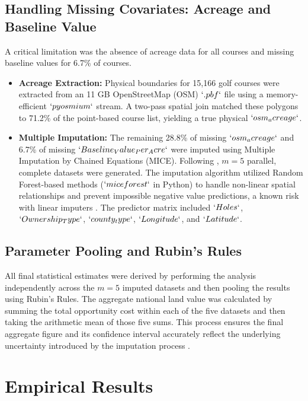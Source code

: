 \documentclass[10pt, letterpaper]{article}
\begin{document}
\subsection{Handling Missing Covariates: Acreage and Baseline Value}
A critical limitation was the absence of acreage data for all courses and missing baseline values for 6.7\% of courses.
\begin{itemize}
    \item \textbf{Acreage Extraction:} Physical boundaries for 15,166 golf courses were extracted from an 11 GB OpenStreetMap (OSM) $`.pbf`$ file using a memory-efficient $`pyosmium`$ stream. A two-pass spatial join matched these polygons to 71.2\% of the point-based course list, yielding a true physical $`osm_acreage`$.
    \item \textbf{Multiple Imputation:} The remaining 28.8\% of missing $`osm_acreage`$ and 6.7\% of missing $`Baseline_Value_Per_Acre`$ were imputed using Multiple Imputation by Chained Equations (MICE). Following \textcite{Rubin1987}, $m = 5$ parallel, complete datasets were generated. The imputation algorithm utilized Random Forest-based methods ($`miceforest`$ in Python) to handle non-linear spatial relationships and prevent impossible negative value predictions, a known risk with linear imputers \parencite{Burren2018}. The predictor matrix included $`Holes`$, $`Ownership_Type`$, $`county_type`$, $`Longitude`$, and $`Latitude`$.
\end{itemize}

\subsection{Parameter Pooling and Rubin's Rules}
All final statistical estimates were derived by performing the analysis independently across the $m=5$ imputed datasets and then pooling the results using Rubin's Rules. The aggregate national land value was calculated by summing the total opportunity cost within each of the five datasets and then taking the arithmetic mean of those five sums. This process ensures the final aggregate figure and its confidence interval accurately reflect the underlying uncertainty introduced by the imputation process \parencite{Burren2018}.

\newpage

\section{Empirical Results}
\end{document}
